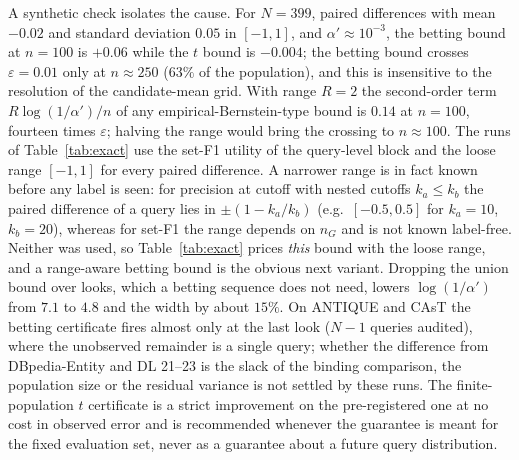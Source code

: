 \documentclass{article}
\newcommand{\eps}{\varepsilon}
\begin{document}
A synthetic check isolates the cause. For $N=399$, paired differences with mean $-0.02$ and standard deviation $0.05$ in $[-1,1]$, and $\alpha'\approx10^{-3}$, the betting bound at $n=100$ is $+0.06$ while the $t$ bound is $-0.004$; the betting bound crosses $\eps=0.01$ only at $n\approx250$ ($63\%$ of the population), and this is insensitive to the resolution of the candidate-mean grid. With range $R=2$ the second-order term $R\log(1/\alpha')/n$ of any empirical-Bernstein-type bound is $0.14$ at $n=100$, fourteen times $\eps$; halving the range would bring the crossing to $n\approx100$. The runs of Table~\ref{tab:exact} use the set-F1 utility of the query-level block and the loose range $[-1,1]$ for every paired difference. A narrower range is in fact known before any label is seen: for precision at cutoff with nested cutoffs $k_a\le k_b$ the paired difference of a query lies in $\pm(1-k_a/k_b)$ (e.g.\ $[-0.5,0.5]$ for $k_a=10$, $k_b=20$), whereas for set-F1 the range depends on $n_G$ and is not known label-free. Neither was used, so Table~\ref{tab:exact} prices \emph{this} bound with the loose range, and a range-aware betting bound is the obvious next variant. Dropping the union bound over looks, which a betting sequence does not need, lowers $\log(1/\alpha')$ from $7.1$ to $4.8$ and the width by about $15\%$. On ANTIQUE and CAsT the betting certificate fires almost only at the last look ($N-1$ queries audited), where the unobserved remainder is a single query; whether the difference from DBpedia-Entity and DL 21--23 is the slack of the binding comparison, the population size or the residual variance is not settled by these runs. The finite-population $t$ certificate is a strict improvement on the pre-registered one at no cost in observed error and is recommended whenever the guarantee is meant for the fixed evaluation set, never as a guarantee about a future query distribution.
\end{document}
